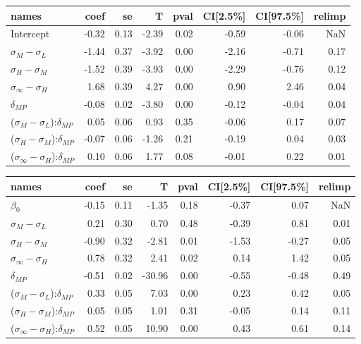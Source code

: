 \begin{tabular}{lrrrrrrr}
\toprule
                                         names &  coef &   se &     T &  pval &  CI[2.5\%] &  CI[97.5\%] &  relimp \\
\midrule
                                     Intercept & -0.32 & 0.13 & -2.39 &  0.02 &      -0.59 &       -0.06 &     NaN \\
                     $\sigma_{M} - \sigma_{L}$ & -1.44 & 0.37 & -3.92 &  0.00 &      -2.16 &       -0.71 &    0.17 \\
                     $\sigma_{H} - \sigma_{M}$ & -1.52 & 0.39 & -3.93 &  0.00 &      -2.29 &       -0.76 &    0.12 \\
                $\sigma_{\infty} - \sigma_{H}$ &  1.68 & 0.39 &  4.27 &  0.00 &       0.90 &        2.46 &    0.04 \\
                                 $\delta_{MP}$ & -0.08 & 0.02 & -3.80 &  0.00 &      -0.12 &       -0.04 &    0.04 \\
     ($\sigma_{M} - \sigma_{L}$):$\delta_{MP}$ &  0.05 & 0.06 &  0.93 &  0.35 &      -0.06 &        0.17 &    0.07 \\
     ($\sigma_{H} - \sigma_{M}$):$\delta_{MP}$ & -0.07 & 0.06 & -1.26 &  0.21 &      -0.19 &        0.04 &    0.03 \\
($\sigma_{\infty} - \sigma_{H}$):$\delta_{MP}$ &  0.10 & 0.06 &  1.77 &  0.08 &      -0.01 &        0.22 &    0.01 \\
\bottomrule
\end{tabular}


\begin{tabular}{lrrrrrrr}
\toprule
                                         names &  coef &   se &      T &  pval &  CI[2.5\%] &  CI[97.5\%] &  relimp \\
\midrule
                                   $\beta_{0}$ & -0.15 & 0.11 &  -1.35 &  0.18 &      -0.37 &        0.07 &     NaN \\
                     $\sigma_{M} - \sigma_{L}$ &  0.21 & 0.30 &   0.70 &  0.48 &      -0.39 &        0.81 &    0.01 \\
                     $\sigma_{H} - \sigma_{M}$ & -0.90 & 0.32 &  -2.81 &  0.01 &      -1.53 &       -0.27 &    0.05 \\
                $\sigma_{\infty} - \sigma_{H}$ &  0.78 & 0.32 &   2.41 &  0.02 &       0.14 &        1.42 &    0.05 \\
                                 $\delta_{MP}$ & -0.51 & 0.02 & -30.96 &  0.00 &      -0.55 &       -0.48 &    0.49 \\
     ($\sigma_{M} - \sigma_{L}$):$\delta_{MP}$ &  0.33 & 0.05 &   7.03 &  0.00 &       0.23 &        0.42 &    0.05 \\
     ($\sigma_{H} - \sigma_{M}$):$\delta_{MP}$ &  0.05 & 0.05 &   1.01 &  0.31 &      -0.05 &        0.14 &    0.11 \\
($\sigma_{\infty} - \sigma_{H}$):$\delta_{MP}$ &  0.52 & 0.05 &  10.90 &  0.00 &       0.43 &        0.61 &    0.14 \\
\bottomrule
\end{tabular}

